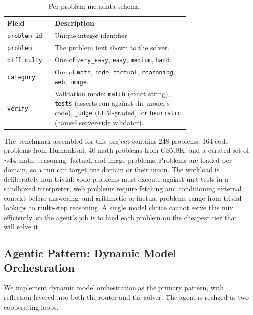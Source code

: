 \documentclass[10pt]{article}
\begin{document}
\begin{table}[ht]
\centering
\small
\begin{tabular}{@{}lp{0.74\linewidth}@{}}
\toprule
\textbf{Field} & \textbf{Description} \\
\midrule
\texttt{problem\_id} & Unique integer identifier. \\
\texttt{problem}     & The problem text shown to the solver. \\
\texttt{difficulty}  & One of \texttt{very\_easy}, \texttt{easy}, \texttt{medium}, \texttt{hard}. \\
\texttt{category}    & One of \texttt{math}, \texttt{code}, \texttt{factual}, \texttt{reasoning}, \texttt{web}, \texttt{image}. \\
\texttt{verify}      & Validation mode: \texttt{match} (exact string), \texttt{tests} (asserts run against the model's code), \texttt{judge} (LLM-graded), or \texttt{heuristic} (named server-side validator). \\
\bottomrule
\end{tabular}
\caption{Per-problem metadata schema.}
\label{tab:problem-schema}
\end{table}

The benchmark assembled for this project contains 248 problems: 164 code problems
from HumanEval, 40 math problems from GSM8K, and a curated set of $\sim\!44$ math,
reasoning, factual, and image problems. Problems are loaded per domain, so a run can
target one domain or their union. The workload is deliberately non-trivial: code
problems must execute against unit tests in a sandboxed interpreter, web problems
require fetching and conditioning external context before answering, and arithmetic or
factual problems range from trivial lookups to multi-step reasoning. A single model
choice cannot serve this mix efficiently, so the agent's job is to land each problem
on the cheapest tier that will solve it.

\subsection{Agentic Pattern: Dynamic Model Orchestration}
\label{sec:pattern}
We implement dynamic model orchestration as the primary pattern, with reflection
layered into both the router and the solver. The agent is realized as two cooperating
loops.
\end{document}
